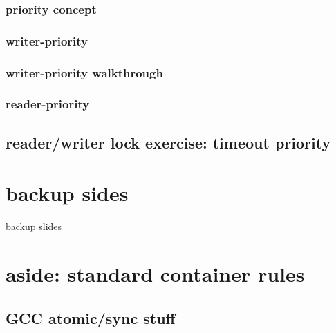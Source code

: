 

\subsubsection{priority concept}



\subsubsection{writer-priority}



\subsubsection{writer-priority walkthrough}


\subsubsection{reader-priority}



\subsection{reader/writer lock exercise: timeout priority}





\section{backup sides}
\begin{frame}{}
\end{frame}

\begin{frame}{backup slides}
\end{frame}


\section{aside: standard container rules}


\subsection{GCC atomic/sync stuff}


